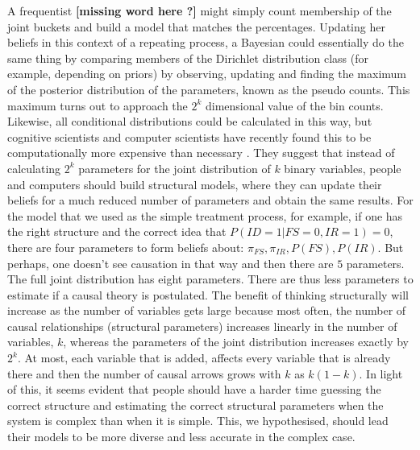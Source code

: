 A frequentist {\bf [missing word here ?]} might simply count membership of the joint buckets and build a model that matches the percentages. Updating her beliefs in this context of a repeating process, a Bayesian could essentially do the same thing by comparing members of the Dirichlet distribution class (for example, depending on priors) by observing, updating and finding the maximum of the posterior distribution of the parameters, known as the pseudo counts. This maximum turns out to approach the $2^k$ dimensional value of the bin counts. Likewise, all conditional distributions could be calculated in this way, but cognitive scientists and computer scientists have recently found this to be computationally more expensive than necessary \citep{Griffith08, Koller03}.  They suggest that instead of calculating $2^k$ parameters for the joint distribution of $k$ binary variables, people and computers should build structural models, where they can update their beliefs for a much reduced number of parameters and obtain the same results. For the model that we used as the simple treatment process, for example, if one has the right structure and the correct idea that $P(ID=1|FS=0, IR=1)=0$, there are four parameters to form beliefs about: $\pi_{FS}, \pi_{IR}, P(FS), P(IR)$. But perhaps, one doesn't see causation in that way and then there are $5$ parameters.  The full joint distribution has eight parameters.  There are thus less parameters to estimate if a causal theory is postulated. The benefit of thinking structurally will increase as the number of variables gets large because most often, the number of causal relationships (structural parameters) increases linearly in the number of variables, $k$, whereas the parameters of the joint distribution increases exactly by $2^k$.  At most, each variable that is added, affects every variable that is already there and then the number of causal arrows grows with $k$ as $k(1-k)$. In light of this, it seems evident that people should have a harder time guessing the correct structure and estimating the correct structural parameters when the system is complex than when it is simple. This, we hypothesised, should lead their models to be more diverse and less accurate in the complex case. 



